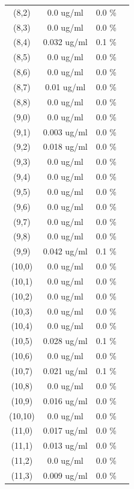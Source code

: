 \documentclass{article}
\begin{document}
\begin{tabular}{c c c c}
(8,2)&        0.0 ug/ml        &0.0 \%\\
(8,3)&        0.0 ug/ml        &0.0 \%\\
(8,4)&        0.032 ug/ml        &0.1 \%\\
(8,5)&        0.0 ug/ml        &0.0 \%\\
(8,6)&        0.0 ug/ml        &0.0 \%\\
(8,7)&        0.01 ug/ml        &0.0 \%\\
(8,8)&        0.0 ug/ml        &0.0 \%\\
(9,0)&        0.0 ug/ml        &0.0 \%\\
(9,1)&        0.003 ug/ml        &0.0 \%\\
(9,2)&        0.018 ug/ml        &0.0 \%\\
(9,3)&        0.0 ug/ml        &0.0 \%\\
(9,4)&        0.0 ug/ml        &0.0 \%\\
(9,5)&        0.0 ug/ml        &0.0 \%\\
(9,6)&        0.0 ug/ml        &0.0 \%\\
(9,7)&        0.0 ug/ml        &0.0 \%\\
(9,8)&        0.0 ug/ml        &0.0 \%\\
(9,9)&        0.042 ug/ml        &0.1 \%\\
(10,0)&        0.0 ug/ml        &0.0 \%\\
(10,1)&        0.0 ug/ml        &0.0 \%\\
(10,2)&        0.0 ug/ml        &0.0 \%\\
(10,3)&        0.0 ug/ml        &0.0 \%\\
(10,4)&        0.0 ug/ml        &0.0 \%\\
(10,5)&        0.028 ug/ml        &0.1 \%\\
(10,6)&        0.0 ug/ml        &0.0 \%\\
(10,7)&        0.021 ug/ml        &0.1 \%\\
(10,8)&        0.0 ug/ml        &0.0 \%\\
(10,9)&        0.016 ug/ml        &0.0 \%\\
(10,10)&        0.0 ug/ml        &0.0 \%\\
(11,0)&        0.017 ug/ml        &0.0 \%\\
(11,1)&        0.013 ug/ml        &0.0 \%\\
(11,2)&        0.0 ug/ml        &0.0 \%\\
(11,3)&        0.009 ug/ml        &0.0 \%\\

\end{tabular}
\end{document}
